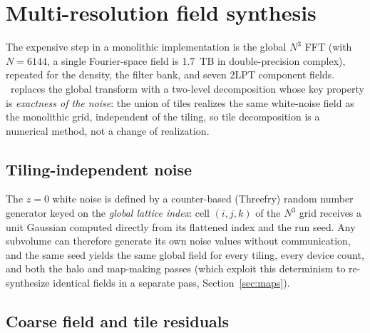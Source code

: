 \section{Multi-resolution field synthesis}
\label{sec:multires}

The expensive step in a monolithic implementation is the global $N^3$ FFT
(with $N=6144$, a single Fourier-space field is 1.7~TB in double-precision
complex), repeated for the density, the filter bank, and seven 2LPT component
fields. \ppjl\ replaces the global transform with a two-level decomposition
whose key property is \emph{exactness of the noise}: the union of tiles
realizes the same white-noise field as the monolithic grid, independent of the
tiling, so tile decomposition is a numerical method, not a change of
realization.

\subsection{Tiling-independent noise}
\label{sec:multires-noise}

The $z=0$ white noise is defined by a counter-based (Threefry) random number
generator \citep{Salmon2011} keyed on the \emph{global lattice index}: cell
$(i,j,k)$ of the $N^3$ grid receives a unit Gaussian computed directly from
its flattened index and the run seed. Any subvolume can therefore generate its
own noise values without communication, and the same seed yields the same
global field for every tiling, every device count, and both the halo and
map-making passes (which exploit this determinism to re-synthesize identical
fields in a separate pass, Section~\ref{sec:maps}).

\subsection{Coarse field and tile residuals}
\label{sec:multires-split}

